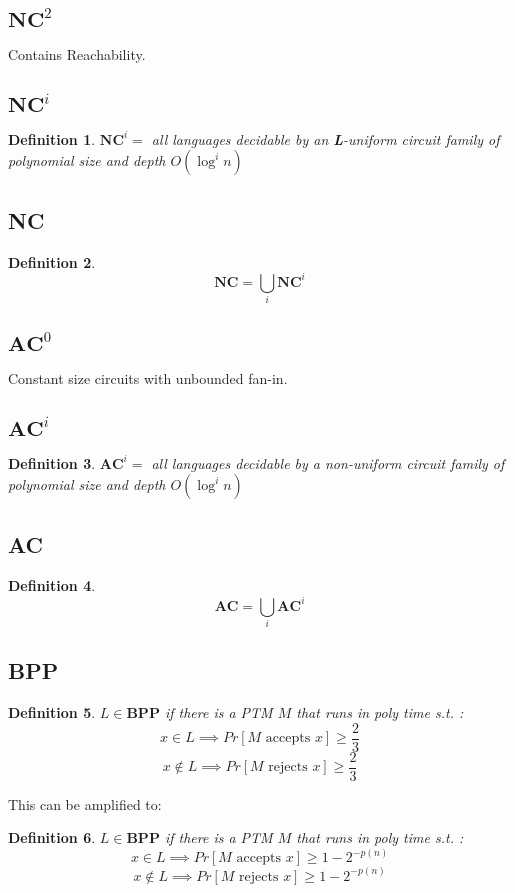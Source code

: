 \documentclass[]{article}
\theoremstyle{break}
\theoremstyle{break}
\newtheorem{definition}{Definition}[section]
\begin{document}
\subsection{$\textbf{NC}^2$}
\label{sec:NC2}
Contains Reachability.
\subsection{$\textbf{NC}^i$}
\label{sec:NCi}
\begin{definition}
	$\textbf{NC}^i = $ all languages decidable by an \textbf{L}-uniform circuit family of polynomial size and depth $O(\log^i n)$
\end{definition}
\subsection{NC}
\label{sec:NC}
\begin{definition}
	$$\textbf{NC} = \bigcup_i \hyperref[sec:NCi]{\textbf{NC}^i}$$
\end{definition}
\subsection{$\textbf{AC}^0$}
\label{sec:AC0}
Constant size circuits with unbounded fan-in.
\subsection{$\textbf{AC}^i$}
\label{sec:ACi}
\begin{definition}
	$\textbf{AC}^i = $ all languages decidable by a non-uniform circuit family of polynomial size and depth $O(\log^i n)$
\end{definition}
\subsection{AC}
\label{sec:AC}
\begin{definition}
	$$\textbf{AC} = \bigcup_i \hyperref[sec:ACi]{\textbf{AC}^i}$$
\end{definition}

\subsection{BPP}
\label{sec:bpp}
\begin{definition}
	$L\in \textbf{BPP}$ if there is a PTM $M$ that runs in poly time s.t. :
	$$x \in L \implies 	Pr[M \text{ accepts } x]\geq \frac{2}{3}$$
	$$x \notin L \implies 	Pr[M \text{ rejects } x]\geq \frac{2}{3}$$
\end{definition}
This can be amplified to:
\begin{definition}
	$L\in \textbf{BPP}$ if there is a PTM $M$ that runs in poly time s.t. :
	$$x \in L \implies 	Pr[M \text{ accepts } x]\geq 1 - 2^{-p(n)}$$
	$$x \notin L \implies 	Pr[M \text{ rejects } x]\geq 1 - 2^{-p(n)}$$
\end{definition}
\end{document}
